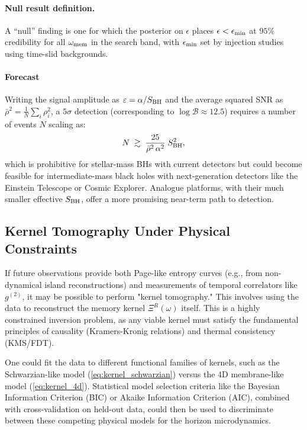\documentclass[a4paper,11pt]{article}
\newcommand{\eg}{e.g.\xspace}
\theoremstyle{plain}
\theoremstyle{definition}
\theoremstyle{remark}
\begin{document}
\paragraph{Null result definition.}
A ``null'' finding is one for which the posterior on $\epsilon$ places $\epsilon<\epsilon_{\rm min}$ at $95\%$ credibility for all $\omega_{\rm mem}$ in the search band,
with $\epsilon_{\rm min}$ set by injection studies using time-slid backgrounds.

\paragraph{Forecast} Writing the signal amplitude as $\varepsilon=\alpha/S_{\rm BH}$ and the average squared SNR as $\bar{\rho}^2=\frac{1}{N}\sum_i \rho_i^2$, a $5\sigma$ detection (corresponding to $\log\mathcal{B} \approx 12.5$) requires a number of events $N$ scaling as:
\begin{equation}
N \;\gtrsim\; \frac{25}{\bar{\rho}^2\,\alpha^2}\; S_{\rm BH}^2,
\end{equation}
which is prohibitive for stellar-mass BHs with current detectors but could become feasible for intermediate-mass black holes with next-generation detectors like the Einstein Telescope or Cosmic Explorer. Analogue platforms, with their much smaller effective $S_{\rm BH}$, offer a more promising near-term path to detection.

\subsection{Kernel Tomography Under Physical Constraints}
\label{subsec:kernel_tomography}
If future observations provide both Page-like entropy curves (\eg, from non-dynamical island reconstructions) and measurements of temporal correlators like $g^{(2)}$, it may be possible to perform "kernel tomography." This involves using the data to reconstruct the memory kernel $\Xi^R(\omega)$ itself. This is a highly constrained inversion problem, as any viable kernel must satisfy the fundamental principles of causality (Kramers-Kronig relations) and thermal consistency (KMS/FDT).

One could fit the data to different functional families of kernels, such as the Schwarzian-like model (\eqref{eq:kernel_schwarzian}) versus the 4D membrane-like model (\eqref{eq:kernel_4d}). Statistical model selection criteria like the Bayesian Information Criterion (BIC) or Akaike Information Criterion (AIC), combined with cross-validation on held-out data, could then be used to discriminate between these competing physical models for the horizon microdynamics.
\end{document}
